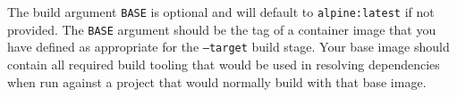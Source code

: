 
The build argument \texttt{BASE} is optional and will default to \texttt{alpine:latest} if not 
provided.  The \texttt{BASE} argument should be the tag of a container image that you have 
defined as appropriate for the \texttt{--target} build stage. Your base image should 
contain all required build tooling that would be used in resolving dependencies when run 
against a project that would normally build with that base image.
